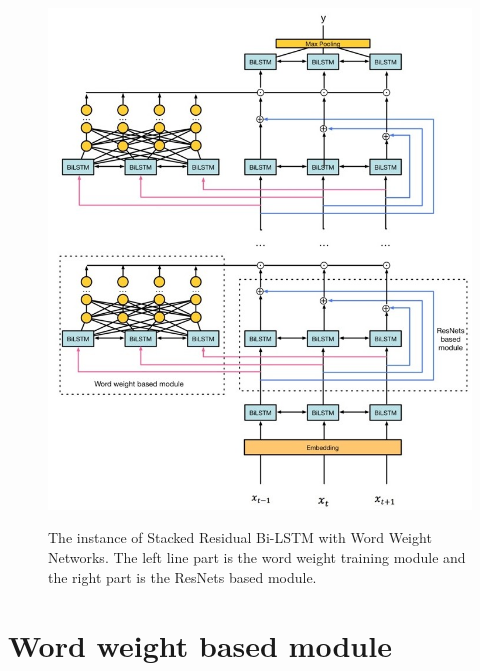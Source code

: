 \documentclass[senior]{IPSstyle}
\begin{document}
\begin{figure}[t]
  \centering
  \includegraphics[width=12cm]{model.jpg}\\
  \caption{The instance of Stacked Residual Bi-LSTM with Word Weight Networks. The left line part is the word weight training module and the right part is the ResNets based module.}\label{NBde}
\end{figure}





\section{Word weight based module}
\end{document}
